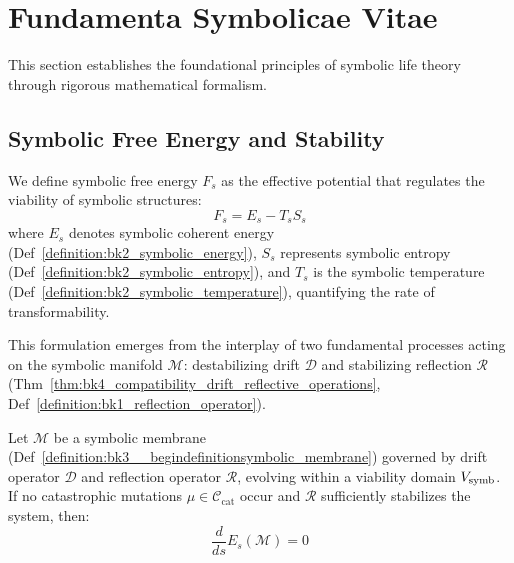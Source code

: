 \section{Fundamenta Symbolicae Vitae}
\label{sec:bk5_funadmenta_symbolicae_vitae}
This section establishes the foundational principles of symbolic life theory through rigorous mathematical formalism.

\subsection{Symbolic Free Energy and Stability}
\label{subsec:bk5_symbolic_free_energy_and_stability}
We define symbolic free energy $F_s$ as the effective potential that regulates the viability of symbolic structures:
\begin{equation}
F_s = E_s - T_s S_s
\end{equation}
\noindent where $E_s$ denotes symbolic coherent energy (Def~\ref{definition:bk2_symbolic_energy}), 
$S_s$ represents symbolic entropy (Def~\ref{definition:bk2_symbolic_entropy}), 
and $T_s$ is the symbolic temperature (Def~\ref{definition:bk2_symbolic_temperature}), 
quantifying the rate of transformability.

This formulation emerges from the interplay of two fundamental processes acting on the symbolic manifold 
$\mathcal{M}$: destabilizing drift $\mathcal{D}$ and stabilizing reflection $\mathcal{R}$ 
(Thm~\ref{thm:bk4_compatibility_drift_reflective_operations}, Def~\ref{definition:bk1_reflection_operator}).

\begin{theorem} 
\label{theorem:bk5_symbolic_coherence_conservation}
Let $\mathcal{M}$ be a symbolic membrane 
(Def~\ref{definition:bk3__begindefinitionsymbolic_membrane}) governed by drift operator $\mathcal{D}$ 
and reflection operator $\mathcal{R}$, evolving within a viability domain $V_{\mathrm{symb}}$. 
If no catastrophic mutations $\mu \in \mathcal{C}_{\mathrm{cat}}$ occur and 
$\mathcal{R}$ sufficiently stabilizes the system, then:
\begin{equation}
\frac{d}{ds} E_s(\mathcal{M}) = 0
\end{equation}
\end{theorem}

